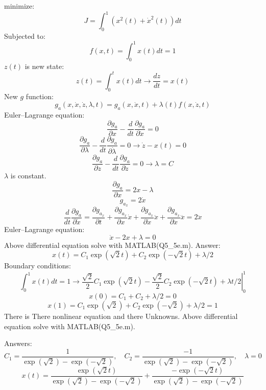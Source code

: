 minimize:
$$J = \int_0^1( x^2(t)+\dot x^2(t))dt$$
Subjected to:
$$f(x, t) = \int_0^1 x(t)dt = 1$$
$z(t)$ is new state:
$$z(t) = \int_{0}^{t} x(t)dt \to \dfrac{dz}{dt} = x(t) $$
New $g$ function:
$$g_a(x, \dot x, \dot z, \lambda, t) = g_a(x, \dot x, t) + \lambda(t)f(x, \dot z, t) $$
Euler–Lagrange equation:
$$\dfrac{\partial g_a}{\partial x} - \dfrac{d}{dt}\dfrac{\partial g_a}{\partial \dot x} = 0$$
$$\dfrac{\partial g_a}{\partial \lambda} - \dfrac{d}{dt}\dfrac{\partial g_a}{\partial \dot \lambda} = 0 \to 
\dot z - x(t) = 0
$$
$$\dfrac{\partial g_a}{\partial z} - \dfrac{d}{dt}\dfrac{\partial g_a}{\partial \dot z} = 0 \to \lambda = C$$
$\lambda$ is constant.
$$\dfrac{\partial g_a}{\partial x} =  2x - \lambda$$
$$g_{a_{\dot{x}}} = 2 \dot x$$
$$\dfrac{d}{dt}\dfrac{\partial g_a}{\partial \dot x} = \dfrac{\partial g_{a_{\dot{x}}}}{\partial  t}+
\dfrac{\partial g_{a_{\dot{x}}}}{\partial  x}\dot x+
\dfrac{\partial g_{a_{\dot{x}}}}{\partial \dot x}\ddot x+
\dfrac{\partial g_{a_{\dot{x}}}}{\partial \ddot x} \dddot x
= 2\ddot x
$$
Euler–Lagrange equation:
$$
\ddot x -2x+\lambda = 0
$$
Above differential equation solve with MATLAB(Q5\_5e.m).
Answer:
$$ x(t) = C_1\exp(\sqrt{2}t) + C_2\exp(-\sqrt{2}t) + \lambda/2 $$
Boundary conditions:
$$\int_0^1 x(t)dt = 1 \to \left.\dfrac{\sqrt{2}}{2}C_1\exp(\sqrt{2}t) -
\dfrac{\sqrt{2}}{2} C_2\exp(-\sqrt{2}t) + \lambda t/2 \right\vert_0^1$$
$$x (0) = C_1+C_2+\lambda/2 = 0$$
$$ x(1) = C_1\exp(\sqrt{2}) + C_2\exp(-\sqrt{2}) + \lambda/2 = 1 $$
There is There nonlinear equation and there Unknowns. Above differential equation solve with MATLAB(Q5\_5e.m).


Answers:
$$C_1 = \dfrac{1}{\exp(\sqrt{2}) - \exp(-\sqrt{2})}, \quad C_2 = \dfrac{-1}{\exp(\sqrt{2}) - \exp(-\sqrt{2})}, \quad \lambda = 0$$
$$ x(t) = \dfrac{\exp(\sqrt{2}t)}{\exp(\sqrt{2}) - \exp(-\sqrt{2})}
+  \dfrac{-\exp(-\sqrt{2}t)}{\exp(\sqrt{2}) - \exp(-\sqrt{2})} $$